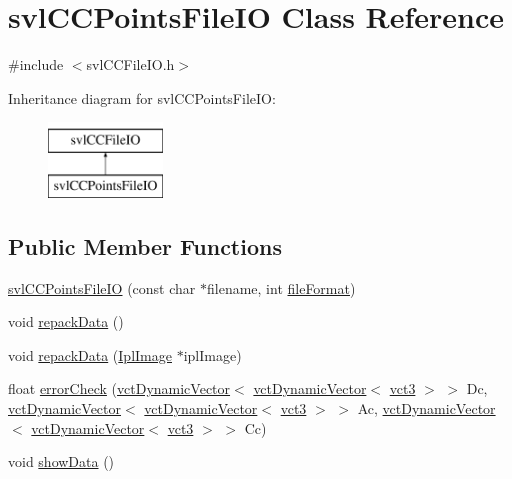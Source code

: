 \hypertarget{classsvl_c_c_points_file_i_o}{\section{svl\-C\-C\-Points\-File\-I\-O Class Reference}
\label{classsvl_c_c_points_file_i_o}
}


{\ttfamily \#include $<$svl\-C\-C\-File\-I\-O.\-h$>$}

Inheritance diagram for svl\-C\-C\-Points\-File\-I\-O\-:\begin{figure}[H]
\begin{center}
\leavevmode
\includegraphics[height=2.000000cm]{d5/d82/classsvl_c_c_points_file_i_o}
\end{center}
\end{figure}
\subsection*{Public Member Functions}
\begin{DoxyCompactItemize}
\item 
\hyperlink{classsvl_c_c_points_file_i_o_a17efbaeedda9d7c97110d0faedbbb2d3}{svl\-C\-C\-Points\-File\-I\-O} (const char $\ast$filename, int \hyperlink{classsvl_c_c_file_i_o_a909643473f103610ef3e3c2f6cc8ab36}{file\-Format})
\item 
void \hyperlink{classsvl_c_c_points_file_i_o_ab7f778789bd5899b73c1d496723a9090}{repack\-Data} ()
\item 
void \hyperlink{classsvl_c_c_points_file_i_o_a149ef96b2b9aafa736a0f7287f091765}{repack\-Data} (\hyperlink{svl_types_8h_aa5a40a13021ba9708bfe921e18fdfa53}{Ipl\-Image} $\ast$ipl\-Image)
\item 
float \hyperlink{classsvl_c_c_points_file_i_o_acaa27bf644becdff6a54c94424179782}{error\-Check} (\hyperlink{classvct_dynamic_vector}{vct\-Dynamic\-Vector}$<$ \hyperlink{classvct_dynamic_vector}{vct\-Dynamic\-Vector}$<$ \hyperlink{vct_fixed_size_vector_types_8h_a3af82acdbf4eeb73c551909240b106ea}{vct3} $>$ $>$ Dc, \hyperlink{classvct_dynamic_vector}{vct\-Dynamic\-Vector}$<$ \hyperlink{classvct_dynamic_vector}{vct\-Dynamic\-Vector}$<$ \hyperlink{vct_fixed_size_vector_types_8h_a3af82acdbf4eeb73c551909240b106ea}{vct3} $>$ $>$ Ac, \hyperlink{classvct_dynamic_vector}{vct\-Dynamic\-Vector}$<$ \hyperlink{classvct_dynamic_vector}{vct\-Dynamic\-Vector}$<$ \hyperlink{vct_fixed_size_vector_types_8h_a3af82acdbf4eeb73c551909240b106ea}{vct3} $>$ $>$ Cc)
\item 
void \hyperlink{classsvl_c_c_points_file_i_o_adfccb5f8adf54c4d1f3a1130b91e5fcf}{show\-Data} ()
\end{DoxyCompactItemize}
